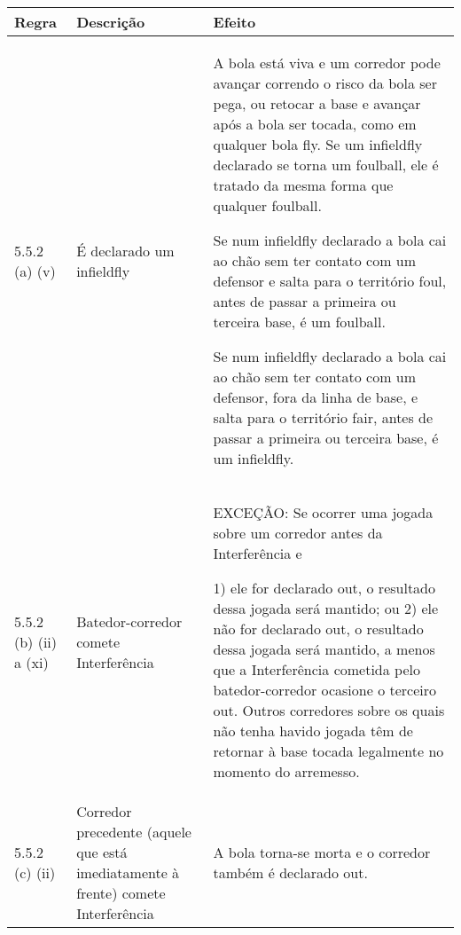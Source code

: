 {\footnotesize\begin{tabular}{p{15mm}p{60mm}p{90mm}}
		Regra& Descrição & Efeito\\\hline
		5.5.2 (a) (v) & É declarado um \gls{infieldfly}
		&

		A bola está viva e um corredor pode avançar correndo o risco da bola ser pega, ou retocar a base e avançar após a bola ser tocada, como em qualquer bola \gls{fly}. Se um \gls{infieldfly} declarado se torna um \gls{foulball}, ele é tratado da mesma forma que qualquer \gls{foulball}.

		Se num \gls{infieldfly} declarado a bola cai ao chão sem ter contato com um defensor e salta para o território \gls{foul}, antes de passar a primeira ou terceira base, é um \gls{foulball}.

		Se num \gls{infieldfly} declarado a bola cai ao chão sem ter contato com um defensor, fora da linha de base, e salta para o território \gls{fair}, antes de passar a primeira ou terceira base, é um \gls{infieldfly}.

		\\  5.5.2 (b) (ii) a (xi) & Batedor-corredor comete Interferência
		&

		EXCEÇÃO: Se ocorrer uma jogada sobre um corredor antes da Interferência e

		1) ele for declarado \gls{out}, o resultado dessa jogada será mantido; ou
		2) ele não for declarado \gls{out}, o resultado dessa jogada será mantido, a menos que a Interferência cometida pelo batedor-corredor ocasione o terceiro \gls{out}. Outros corredores sobre os quais não tenha havido jogada têm de retornar à base tocada legalmente no momento do arremesso.

		\\[4mm]\hline
		5.5.2 (c) (ii) & Corredor precedente (aquele que está imediatamente à frente) comete Interferência
		& A bola torna-se morta e o corredor também é declarado \gls{out}.
\end{tabular}}
